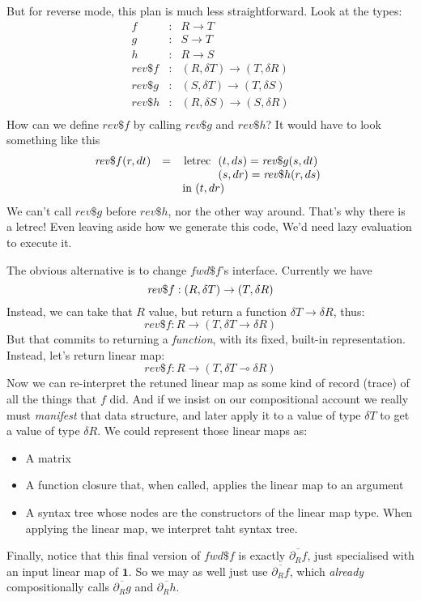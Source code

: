 \documentclass[sigplan,review]{acmart}
\newcommand{\deriv}{\partial}  %
\renewcommand{\to}{\rightarrow}    %
\newcommand{\linto}{\multimap}     %
\newcommand{\gradft}[1]{\deriv_R#1}  %
\newcommand{\tangent}[1]{\delta #1}
\newcommand{\ogradft}[1]{\overline{\gradft{#1}}}  %
\newcommand{\fwdDf}[1]{\mathit{fwd\$}#1}  %
\newcommand{\revDf}[1]{\mathit{rev\$}#1}  %
\newcommand{\lmone}{\mathbf{1}}      %
\begin{document}
But for reverse mode, this plan is much less straightforward.   Look at the types:
$$
\begin{array}{rcl}
f & : & R \to T \\
g & : & S \to T \\
h & : & R \to S \\
\revDf{f} & : & (R, \tangent{T}) \to (T, \tangent{R}) \\
\revDf{g} & : & (S, \tangent{T}) \to (T, \tangent{S}) \\
\revDf{h} & : & (R, \tangent{S}) \to (S, \tangent{R}) \\
\end{array}
$$
How can we define $\revDf{f}$ by calling $\revDf{g}$ and $\revDf{h}$?  It would
have to look something like this
$$
\begin{array}{rcl}
\revDf{f}(r,dt) & = & \lstinline|letrec| \begin{array}[t]{l}
                          (t, ds) = \revDf{g}( s, dt ) \\
                          (s, dr) = \revDf{h}( r, ds ) \\
                        \end{array} \\
 && \lstinline|in| \; (t, dr)
\end{array}
$$
We can't call $\revDf{g}$ before $\revDf{h}$, nor the other way around.
That's why there is a letrec!  Even leaving aside how we generate this code,
We'd need lazy evaluation to execute it.

The obvious alternative is to change $\fwdDf{f}$'s interface.  Currently we have
$$
\revDf{f} : (R, \tangent{T}) \to (T, \tangent{R}) \\
$$
Instead, we can take that $R$ value, but return a function
$\tangent{T} \to \tangent{R}$, thus:
$$
\revDf{f} : R \to (T, \tangent{T} \to \tangent{R})
$$
But that commits to returning a \emph{function}, with its fixed, built-in representation.
Instead, let's return linear map:
$$
\revDf{f} : R \to (T, \tangent{T} \linto \tangent{R})
$$
Now we can re-interpret the retuned linear map as some kind of record (trace) of
all the things that $f$ did.  And if we insist on our compositional account
we really must \emph{manifest} that data structure, and later apply it to a value of
type $\tangent{T}$ to get a value of type $\tangent{R}$.  We could represent those linear maps as:
\begin{itemize}
\item A matrix
\item A function closure that, when called, applies the linear map to an argument
\item A syntax tree whose nodes are the constructors of the linear map type.
  When applying the linear map, we interpret taht syntax tree.
\end{itemize}
Finally, notice that this final version of $\fwdDf{f}$ is exactly $\ogradft{f}$,
just specialised with an input linear map of $\lmone$.  So we may as well
just use $\ogradft{f}$, which \emph{already} compositionally calls $\ogradft{g}$
and $\ogradft{h}$.
\end{document}
